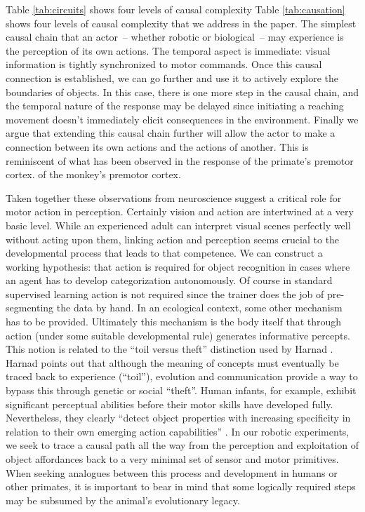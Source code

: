 \ifrev
Table \ref{tab:circuits} shows four levels of causal complexity
\else
Table \ref{tab:causation} shows four levels of causal complexity
\fi
that we address in the paper.
The simplest causal chain that an actor~-- whether robotic or biological~-- may experience is the
perception of its own actions.  The temporal aspect is immediate:
visual information is tightly synchronized to motor commands.
Once this causal connection is established, we can go further and use
it to actively explore the boundaries of objects.  In this case, there
is one more step in the causal chain, and the temporal nature of
the response may be delayed since initiating a reaching movement doesn't
immediately elicit consequences in the environment.  
Finally we argue that extending this causal chain further will allow
the actor to make a connection between its own actions and the actions 
of another. This is reminiscent of what has been observed in the response
\ifrev
of the primate's premotor cortex. 
\else
of the monkey's premotor cortex. 
\fi

\ifrev
Taken together these observations from neuroscience suggest a critical role
for motor action in perception. Certainly vision and action are
intertwined at a very basic level.  While an
experienced adult can interpret visual scenes perfectly well without
acting upon them, linking action and perception seems crucial to the
developmental process that leads to that competence.  We can construct
a working hypothesis: that action is required for object recognition in
cases where an agent has to develop categorization autonomously. 
Of course in standard supervised learning action is not required since
the trainer does the job of pre-segmenting the data by hand.  In an
ecological context, some other mechanism has to be provided.
Ultimately this mechanism is the body itself that through action
(under some suitable developmental rule) generates informative
percepts.
%
\ifrev
%
This notion is related to the ``toil versus theft'' distinction used
by Harnad \cite{harnad02symbol}.  Harnad points out that although the
meaning of concepts must eventually be traced back to experience
(``toil''), evolution and communication provide a way to bypass this
through genetic or social ``theft''.
%
Human infants, for example, exhibit significant perceptual abilities
before their motor skills have developed fully.  Nevertheless, they
clearly ``detect object properties with increasing specificity in
relation to their own emerging action capabilities''
\cite{adolph93development}.
%
In our robotic experiments, we seek to trace a causal path all the
way from the perception and exploitation of object affordances
back to a very minimal set of sensor and motor primitives.  When
seeking analogues between this process and development in humans
or other primates, it is important to bear in mind that some
logically required steps may be subsumed by the animal's evolutionary
legacy.
%
\fi

